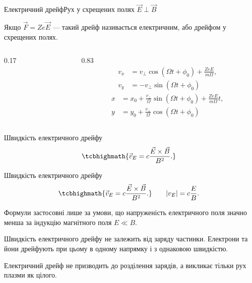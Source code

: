 \documentclass[]{beamer}
\begin{document}
\begin{frame}{Електричний дрейф}{Рух у схрещених полях $\vec{E}\perp\vec{B}$}
	\begin{overprint}
		\begin{block}{}\justifying
			Якщо $\vec{F} = Ze\vec{E}$ ---  такий дрейф називається \alert{електричним}, або \alert{дрейфом у схрещених полях}.
		\end{block}
		\begin{columns}[T]
			\begin{column}{0.17\linewidth}
				\begin{center}
					
				\end{center}
			\end{column}
			\begin{column}{0.83\linewidth}\small
				\begin{align*}
					v_x & = v_\perp\cos(\Omega t + \phi_0) + \frac{ZeE}{m\Omega}, \\
					v_y & = - v_\perp\sin(\Omega t + \phi_0)
				\end{align*}
				\begin{align*}
					x & = x_0 + \frac{v_\perp}{\Omega}\sin(\Omega t + \phi_0)+ \frac{ZeE}{m\Omega} t, \\
					y & = y_0 + \frac{v_\perp}{\Omega}\cos(\Omega t + \phi_0)
				\end{align*}
			\end{column}
		\end{columns}
		\begin{block}{Швидкість електричного дрейфу}
			\begin{equation*}
				\tcbhighmath{
					\vec{v}_E = c\frac{\vec{E}\times\vec{B}}{B^2}.
				}
			\end{equation*}
		\end{block}
		\begin{center}
			
		\end{center}
		\begin{block}{Швидкість електричного дрейфу}\justifying
			\begin{equation*}
				\tcbhighmath{
					\vec{v}_E = c\frac{\vec{E}\times\vec{B}}{B^2}.
				}\qquad |v_E| = c\frac{E}{B}.
			\end{equation*}
		\end{block}
		\begin{block}{}
			Формули застосовні лише за умови, що напруженість електричного поля значно менша за індукцію магнітного поля \alert{$E \ll B$}.

			\medskip

			Швидкість електричного дрейфу не залежить від заряду частинки. Електрони та йони дрейфують при цьому в одному напрямку і з однаковою швидкістю.

			\medskip

			Електричний дрейф не призводить до розділення зарядів, а викликає тільки рух плазми як цілого.
		\end{block}
	\end{overprint}
\end{frame}
\end{document}
